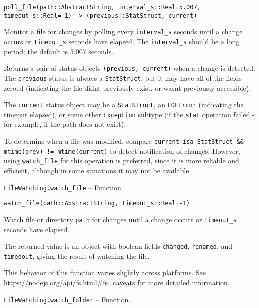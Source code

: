 \begin{adjustwidth}{2em}{0pt}


\begin{verbatim}
poll_file(path::AbstractString, interval_s::Real=5.007, timeout_s::Real=-1) -> (previous::StatStruct, current)
\end{verbatim}

Monitor a file for changes by polling every \texttt{interval\_s} seconds until a change occurs or \texttt{timeout\_s} seconds have elapsed. The \texttt{interval\_s} should be a long period; the default is 5.007 seconds.

Returns a pair of status objects \texttt{(previous, current)} when a change is detected. The \texttt{previous} status is always a \texttt{StatStruct}, but it may have all of the fields zeroed (indicating the file didn{\textquotesingle}t previously exist, or wasn{\textquotesingle}t previously accessible).

The \texttt{current} status object may be a \texttt{StatStruct}, an \texttt{EOFError} (indicating the timeout elapsed), or some other \texttt{Exception} subtype (if the \texttt{stat} operation failed - for example, if the path does not exist).

To determine when a file was modified, compare \texttt{current isa StatStruct \&\& mtime(prev) != mtime(current)} to detect notification of changes. However, using \hyperlink{9407226289289061636}{\texttt{watch\_file}} for this operation is preferred, since it is more reliable and efficient, although in some situations it may not be available.



\end{adjustwidth}
\hypertarget{9407226289289061636}{} 
\hyperlink{9407226289289061636}{\texttt{FileWatching.watch\_file}}  -- {Function.}

\begin{adjustwidth}{2em}{0pt}


\begin{verbatim}
watch_file(path::AbstractString, timeout_s::Real=-1)
\end{verbatim}

Watch file or directory \texttt{path} for changes until a change occurs or \texttt{timeout\_s} seconds have elapsed.

The returned value is an object with boolean fields \texttt{changed}, \texttt{renamed}, and \texttt{timedout}, giving the result of watching the file.

This behavior of this function varies slightly across platforms. See \href{https://nodejs.org/api/fs.html\#fs\_caveats}{https://nodejs.org/api/fs.html\#fs\_caveats} for more detailed information.



\end{adjustwidth}
\hypertarget{3977882412787158374}{} 
\hyperlink{3977882412787158374}{\texttt{FileWatching.watch\_folder}}  -- {Function.}

